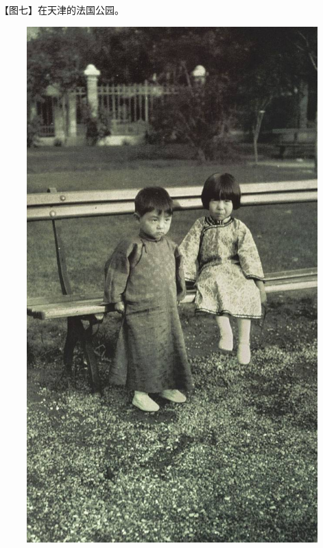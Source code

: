 \clearpage
\par 【图七】在天津的法国公园。
\begin{figure}[htb]
    \centering %
    \includegraphics[scale=0.4]{picture/对照记7.jpeg}
\end{figure}


